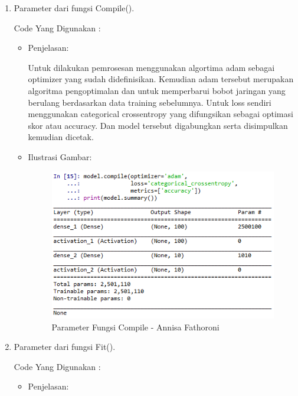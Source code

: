 \begin{enumerate}
\begin{itemize}
\end{itemize}

\item Parameter dari fungsi Compile().

Code Yang Digunakan :


\begin{itemize}
\item Penjelasan:

Untuk dilakukan pemrosesan menggunakan algortima adam sebagai optimizer yang sudah didefinisikan. Kemudian adam tersebut merupakan algoritma pengoptimalan dan untuk memperbarui bobot jaringan yang berulang berdasarkan data training sebelumnya. Untuk loss sendiri menggunakan categorical crossentropy yang difungsikan sebagai optimasi skor atau accuracy. Dan model tersebut digabungkan serta disimpulkan kemudian dicetak.

\item Ilustrasi Gambar:

\begin{figure}[!hbtp]
\centering
\includegraphics[scale=0.7]{figures/Chapter6AnnisaFathoroni21.png}
\caption{Parameter Fungsi Compile - Annisa Fathoroni}
\label{Parameter Fungsi Compile - Annisa Fathoroni}
\end{figure}

\end{itemize}

\item Parameter dari fungsi Fit().

Code Yang Digunakan :


\begin{itemize}
\item Penjelasan:


\end{itemize}
\end{enumerate}
